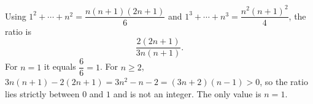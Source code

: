 Using $1^2+\cdots+n^2=\dfrac{n(n+1)(2n+1)}6$ and $1^3+\cdots+n^3=\dfrac{n^2(n+1)^2}4$, the ratio is
\[\dfrac{2(2n+1)}{3n(n+1)}.\]
For $n=1$ it equals $\dfrac{6}{6}=1$. For $n\ge2$, $3n(n+1)-2(2n+1)=3n^2-n-2=(3n+2)(n-1)>0$, so the ratio lies strictly between $0$ and $1$ and is not an integer. The only value is $\boxed{n=1}$.
